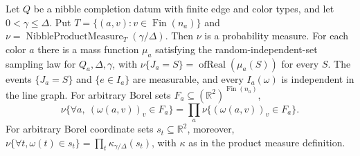 \begin{lemma}
Let $Q$ be a nibble completion datum with finite edge and color types,
and let $0<\gamma\le\Delta$. Put $T=\{(a,v):v\in\operatorname{Fin}(n_a)\}$
and $\nu=\operatorname{NibbleProductMeasure}_T(\gamma/\Delta)$.
Then $\nu$ is a probability measure. For each color $a$ there is a mass
function $\mu_a$ satisfying the random-independent-set sampling law for
$Q_a,\Delta,\gamma$, with
$\nu\{J_a=S\}=\operatorname{ofReal}(\mu_a(S))$ for every $S$.
The events $\{J_a=S\}$ and $\{e\in I_a\}$ are measurable, and every
$I_a(\omega)$ is independent in the line graph.
For arbitrary Borel sets $F_a\subseteq(\mathbb R^2)^{\operatorname{Fin}(n_a)}$,
\[
\nu\{\forall a,\ (\omega(a,v))_v\in F_a\}
=\prod_a\nu\{(\omega(a,v))_v\in F_a\}.
\]
For arbitrary Borel coordinate sets $s_t\subseteq\mathbb R^2$, moreover,
$\nu\{\forall t,\omega(t)\in s_t\}=\prod_t\kappa_{\gamma/\Delta}(s_t)$,
with $\kappa$ as in the product measure definition.
\end{lemma}

